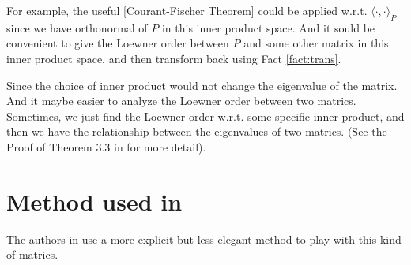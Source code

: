 \documentclass{article}
\def\<{\langle}
\def\>{\rangle}
\begin{document}
For example, the useful [Courant-Fischer Theorem] could be applied w.r.t. $\<\cdot, \cdot\>_P$ since we have orthonormal of $P$ in this inner product space. And it sould be convenient to give the Loewner order between $P$ and some other matrix in this inner product space, and then transform back using Fact \ref{fact:trans}.

Since the choice of inner product would not change the eigenvalue of the matrix.
And it maybe easier to analyze the Loewner order between two matrics.
Sometimes, we just find the Loewner order w.r.t. some specific inner product, and then we have the relationship between the eigenvalues of two matrics. (See the Proof of Theorem 3.3 in \cite{anari2019log} for more detail).

\section{Method used in \cite{cryan2019modified}}
The authors in \cite{cryan2019modified} use a more explicit but less elegant method to play with this kind of matrics.
\end{document}
